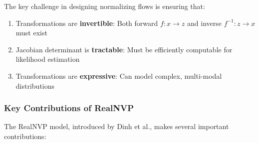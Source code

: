 \documentclass[conference,12pt]{IEEEtran}
\begin{document}
The key challenge in designing normalizing flows is ensuring that:
\begin{enumerate}
    \item Transformations are \textbf{invertible}: Both forward $f: x \rightarrow z$ and inverse $f^{-1}: z \rightarrow x$ must exist
    \item Jacobian determinant is \textbf{tractable}: Must be efficiently computable for likelihood estimation
    \item Transformations are \textbf{expressive}: Can model complex, multi-modal distributions
\end{enumerate}

\subsubsection{Key Contributions of RealNVP}

The RealNVP model, introduced by Dinh et al., makes several important contributions:
\end{document}
